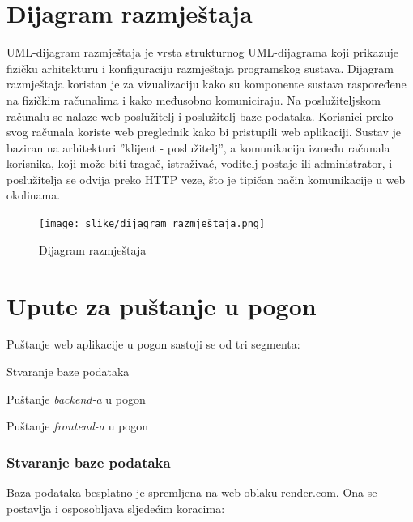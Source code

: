 			\eject 
		
		
		\section{Dijagram razmještaja}

		UML-dijagram razmještaja je vrsta strukturnog UML-dijagrama 
		koji prikazuje fizičku arhitekturu i konfiguraciju 
		razmještaja programskog sustava. Dijagram razmještaja koristan je 
		za vizualizaciju kako su komponente sustava raspoređene na fizičkim 
		računalima i kako međusobno komuniciraju.
		Na poslužiteljskom računalu se 
		nalaze web poslužitelj i poslužitelj baze podataka. Korisnici preko svog računala koriste web
		preglednik kako bi pristupili web aplikaciji. Sustav je baziran na arhitekturi 
		”klijent - poslužitelj”, a komunikacija između računala korisnika, 
		koji može biti tragač, istraživač, voditelj postaje ili administrator, i poslužitelja se 
		odvija preko HTTP veze, što je tipičan način komunikacije u web okolinama.

		\begin{figure}[H]
			\texttt{[image: slike/dijagram razmještaja.png]}
			\centering
			\caption{Dijagram razmještaja}
			\label{fig:dijagram razmještaja}
		\end{figure}
			\eject 
		
		\section{Upute za puštanje u pogon}
		
			Puštanje web aplikacije u pogon sastoji se od tri segmenta:

			\begin{packed_item}
				\item Stvaranje baze podataka
				\item Puštanje \textit{backend-a} u pogon
				\item Puštanje \textit{frontend-a} u pogon
			\end{packed_item}

			\subsubsection{Stvaranje baze podataka}

			Baza podataka besplatno je spremljena na web-oblaku render.com. 
			Ona se postavlja i osposobljava sljedećim koracima:

